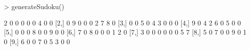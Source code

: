 \begin{Schunk}
\begin{Sinput}
> generateSudoku()
\end{Sinput}
\begin{Soutput}
      [,1] [,2] [,3] [,4] [,5] [,6] [,7] [,8] [,9]
 [1,]    2    0    0    0    0    0    4    0    0
 [2,]    0    9    0    0    0    2    7    8    0
 [3,]    0    0    5    0    4    3    0    0    0
 [4,]    9    0    4    2    6    0    5    0    0
 [5,]    0    0    0    8    0    0    9    0    0
 [6,]    7    0    8    0    0    0    1    2    0
 [7,]    3    0    0    0    0    0    0    5    7
 [8,]    5    0    7    0    0    9    0    1    0
 [9,]    6    0    0    7    0    5    3    0    0
\end{Soutput}
\end{Schunk}
